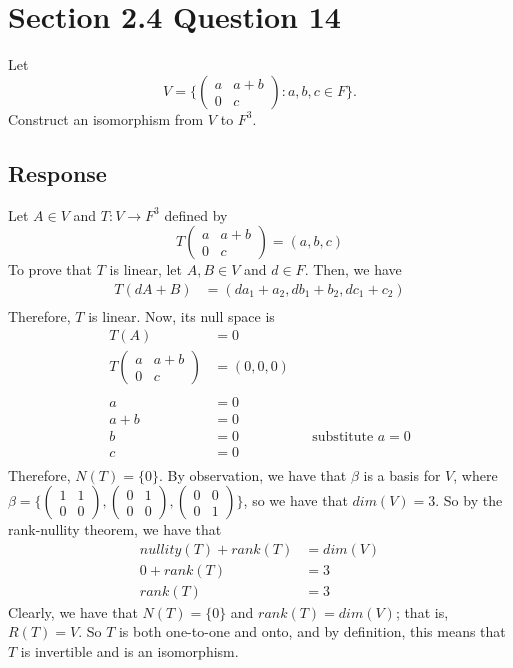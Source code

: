 \documentclass[13pt]{article}
\begin{document}
\newpage
\section*{Section 2.4 Question 14}
Let
\[V = \bigg\{
  \begin{pmatrix}
    a & a + b \\
    0 & c
  \end{pmatrix} : a, b, c \in F \bigg\}.\]
Construct an isomorphism from $V$ to $F^3$.
\subsection*{Response}
Let $A \in V$ and $T : V \rightarrow F^3$ defined by
\[T
  \begin{pmatrix}
    a & a + b \\
    0 & c
  \end{pmatrix} = (a, b, c)\]
To prove that $T$ is linear, let $A, B \in V$ and $d \in F$. Then, we have
\begin{align*}
  T(dA + B) &= (da_1 + a_2, db_1 + b_2, dc_1 + c_2) \\
\end{align*}
Therefore, $T$ is linear. Now, its null space is
\begin{align*}
  T(A) &= 0 \\
  T
  \begin{pmatrix}
    a & a + b \\
    0 & c
  \end{pmatrix}
  &= (0, 0, 0)  \\ \\
  a &= 0 \\
  a + b &= 0 \\
  b &= 0 && \text{substitute } a = 0 \\
  c &= 0 \\
\end{align*}
Therefore, $N(T) = \{ 0 \}$. By observation, we have that $\beta$ is a basis for $V$, where $\beta =
\bigg\{ \begin{pmatrix}
          1 & 1 \\
          0 & 0
        \end{pmatrix},
        \begin{pmatrix}
          0 & 1 \\
          0 & 0
        \end{pmatrix},
        \begin{pmatrix}
          0 & 0 \\
          0 & 1
        \end{pmatrix} \bigg\}$, so we have that $dim(V) = 3$. So by the rank-nullity theorem, we have that
        \begin{align*}
          nullity(T) + rank(T) &= dim(V) \\
          0 + rank(T) &= 3 \\
          rank(T) &= 3
        \end{align*}
        Clearly, we have that $N(T) = \{ 0 \}$ and $rank(T) = dim(V)$; that is, $R(T) = V$. So $T$ is both one-to-one and onto, and by definition, this means that $T$ is invertible and is an isomorphism.
\end{document}
